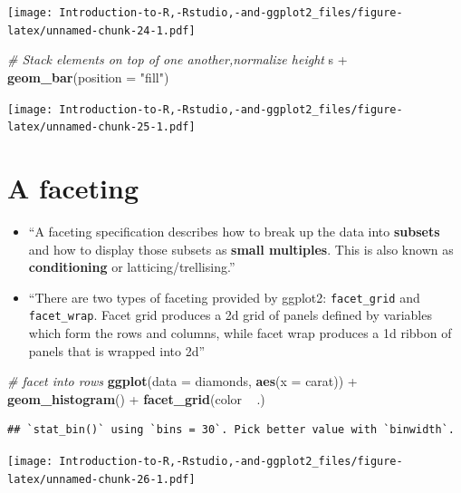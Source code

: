 \documentclass[]{book}
\newenvironment{Shaded}{\begin{snugshade}}{\end{snugshade}}
\newcommand{\KeywordTok}[1]{\textcolor[rgb]{0.13,0.29,0.53}{\textbf{{#1}}}}
\newcommand{\DataTypeTok}[1]{\textcolor[rgb]{0.13,0.29,0.53}{{#1}}}
\newcommand{\StringTok}[1]{\textcolor[rgb]{0.31,0.60,0.02}{{#1}}}
\newcommand{\CommentTok}[1]{\textcolor[rgb]{0.56,0.35,0.01}{\textit{{#1}}}}
\newcommand{\NormalTok}[1]{{#1}}
\begin{document}
\texttt{[image: Introduction-to-R,-Rstudio,-and-ggplot2\_files/figure-latex/unnamed-chunk-24-1.pdf]}

\begin{Shaded}
\begin{Highlighting}[]
\CommentTok{# Stack elements on top of one another,normalize height}
\NormalTok{s +}\StringTok{ }\KeywordTok{geom_bar}\NormalTok{(}\DataTypeTok{position =} \StringTok{"fill"}\NormalTok{)}
\end{Highlighting}
\end{Shaded}

\texttt{[image: Introduction-to-R,-Rstudio,-and-ggplot2\_files/figure-latex/unnamed-chunk-25-1.pdf]}

\section{A faceting}\label{a-faceting}

\begin{itemize}
\item
  ``A faceting specification describes how to break up the data into
  \textbf{subsets} and how to display those subsets as \textbf{small
  multiples}. This is also known as \textbf{conditioning} or
  latticing/trellising.'' \citep{ggplot2}
\item
  ``There are two types of faceting provided by ggplot2:
  \texttt{facet\_grid} and \texttt{facet\_wrap}. Facet grid produces a
  2d grid of panels defined by variables which form the rows and
  columns, while facet wrap produces a 1d ribbon of panels that is
  wrapped into 2d'' \citep{ggplot2}
\end{itemize}

\begin{Shaded}
\begin{Highlighting}[]
\CommentTok{# facet into rows}
\KeywordTok{ggplot}\NormalTok{(}\DataTypeTok{data =} \NormalTok{diamonds, }\KeywordTok{aes}\NormalTok{(}\DataTypeTok{x =} \NormalTok{carat)) +}\StringTok{ }\KeywordTok{geom_histogram}\NormalTok{() +}\StringTok{ }\KeywordTok{facet_grid}\NormalTok{(color ~}\StringTok{ }\NormalTok{.)}
\end{Highlighting}
\end{Shaded}

\begin{verbatim}
## `stat_bin()` using `bins = 30`. Pick better value with `binwidth`.
\end{verbatim}

\texttt{[image: Introduction-to-R,-Rstudio,-and-ggplot2\_files/figure-latex/unnamed-chunk-26-1.pdf]}
\end{document}
